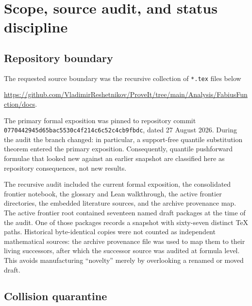 \documentclass[11pt,oneside]{article}
\theoremstyle{definition}
\theoremstyle{remark}
\newcommand{\CommitID}{\texttt{0770442945d65bac5530\allowbreak c4f214c6c52c4cb9fbdc}}
\begin{document}
\tableofcontents
\clearpage

\section{Scope, source audit, and status discipline}
\label{sec:audit}

\subsection{Repository boundary}

The requested source boundary was the recursive collection of \texttt{*.tex} files below
\begin{center}
\small
\url{https://github.com/VladimirReshetnikov/ProveIt/tree/main/Analysis/FabiusFunction/docs}.
\end{center}
The primary formal exposition was pinned to repository commit
\CommitID, dated 27 August 2026.  During the audit the
branch changed: in particular, a support-free quantile substitution theorem entered the
primary exposition.  Consequently, quantile pushforward formulae that looked new against an
earlier snapshot are classified here as repository consequences, not new results.

The recursive audit included the current formal exposition, the consolidated frontier
notebook, the glossary and Lean walkthrough, the active frontier directories, the embedded
literature sources, and the archive provenance map.  The active frontier root contained
seventeen named draft packages at the time of the audit.  One of those packages records a
snapshot with sixty-seven distinct TeX paths.  Historical byte-identical copies were not
counted as independent mathematical sources: the archive provenance file was used to map
them to their living successors, after which the successor source was audited at formula
level.  This avoids manufacturing ``novelty'' merely by overlooking a renamed or moved draft.

\subsection{Collision quarantine}
\end{document}
